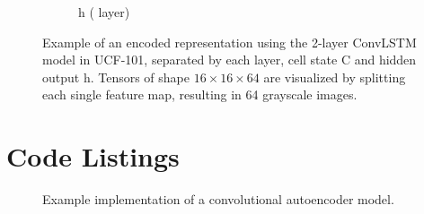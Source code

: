 \begin{figure}[h!tb]
\begin{subfigure}{0.24\textwidth}
  \caption{h \tiny{( layer)}}
  \label{fig:ucf-lrep4}
  \vspace{.1cm}
\end{subfigure}
\caption[Encoded Representation in UCF-101]{Example of an encoded representation using the 2-layer ConvLSTM model in UCF-101, separated by each layer, cell state C and hidden output h. Tensors of shape $16 \times 16 \times 64$ are visualized by splitting each single feature map, resulting in 64 grayscale images.}
\label{fig:ucf-lrep}
\end{figure}


\clearpage
\section{Code Listings}

\begin{figure}[h!tb]
  
  \caption[Code: Convolutional Autoencoder]{Example implementation of a convolutional autoencoder model.}\label{code:model}
\end{figure}

